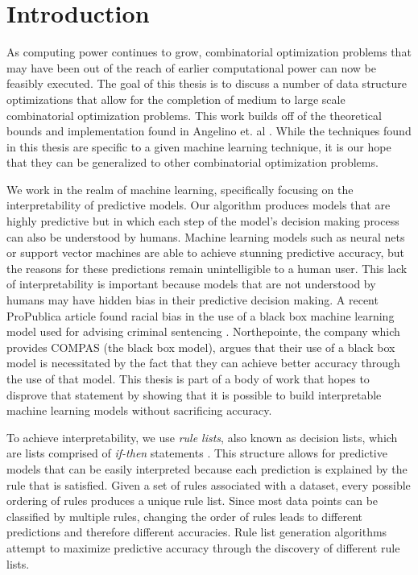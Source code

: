 \chapter{Introduction}
\label{introduction}

As computing power continues to grow, combinatorial optimization problems that may have been out of the reach of earlier computational power can now be feasibly executed.
The goal of this thesis is to discuss a number of data structure optimizations that allow for the completion of medium to large scale combinatorial optimization problems.
This work builds off of the theoretical bounds and implementation found in Angelino et. al \cite{AngelinoLaAlSeRu17}.
While the techniques found in this thesis are specific to a given machine learning technique, it is our hope that they can be generalized to other combinatorial optimization problems.

We work in the realm of machine learning, specifically focusing on the interpretability of predictive models.
Our algorithm produces models that are highly predictive but in which each step of the model's decision making process can also be understood by humans.
Machine learning models such as neural nets or support vector machines are able to achieve stunning predictive accuracy, but the reasons for these predictions remain unintelligible to a human user.
This lack of interpretability is important because models that are not understood by humans may have hidden bias in their predictive decision making.
A recent ProPublica article found racial bias in the use of a black box machine learning model used for advising criminal sentencing \cite{LarsonMaKiAn16}.
Northepointe, the company which provides COMPAS (the black box model), argues that their use of a black box model is necessitated by the fact that they can achieve better accuracy through the use of that model.
This thesis is part of a body of work that hopes to disprove that statement by showing that it is possible to build interpretable machine learning models without sacrificing accuracy.

To achieve interpretability, we use \emph{rule lists}, also known as decision lists, which are lists comprised of \emph{if-then} statements \cite{Rivest87}. 
This structure allows for predictive models that can be easily interpreted because each prediction is explained by the rule that is satisfied. 
Given a set of rules associated with a dataset, every possible ordering of rules produces a unique rule list.
Since most data points can be classified by multiple rules, changing the order of rules leads to different predictions and therefore different accuracies. 
Rule list generation algorithms attempt to maximize predictive accuracy through the discovery of different rule lists.

